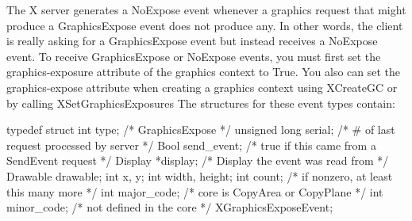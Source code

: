 \documentclass{report}
\begin{document}
\begin{itemize}
            \bigbreak \noindent 
            The X server generates a NoExpose event whenever a graphics request that might produce a GraphicsExpose event does not produce any. In other words, the client is really asking for a GraphicsExpose event but instead receives a NoExpose event.
            \bigbreak \noindent 
            To receive GraphicsExpose or NoExpose events, you must first set the graphics-exposure attribute of the graphics context to True. You also can set the graphics-expose attribute when creating a graphics context using XCreateGC or by calling XSetGraphicsExposures
            \bigbreak \noindent 
            The structures for these event types contain:
            \bigbreak \noindent 
            \begin{cppcode}
                typedef struct {
                    int type;               /* GraphicsExpose */
                    unsigned long serial;   /* # of last request processed by server */
                    Bool send_event;        /* true if this came from a SendEvent request */
                    Display *display;       /* Display the event was read from */
                    Drawable drawable;
                    int x, y;
                    int width, height;
                    int count;              /* if nonzero, at least this many more */
                    int major_code;         /* core is CopyArea or CopyPlane */
                    int minor_code;         /* not defined in the core */
                } XGraphicsExposeEvent;


\end{cppcode}
\end{itemize}
\end{document}
